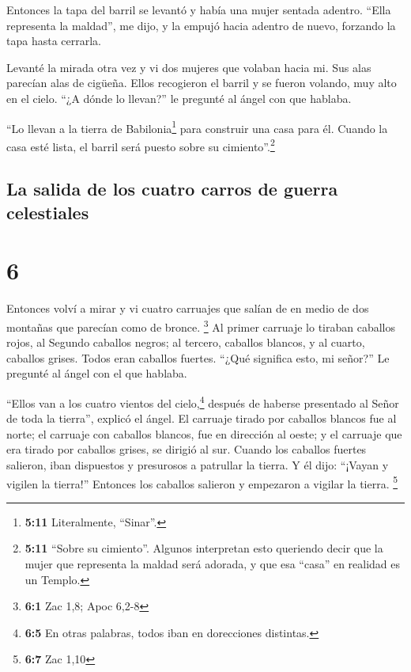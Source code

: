  Entonces la tapa del barril se levantó y había una mujer
sentada adentro.  ``Ella representa la maldad'', me dijo,
y la empujó hacia adentro de nuevo, forzando la tapa hasta cerrarla.

 Levanté la mirada otra vez y vi dos mujeres que volaban
hacia mi. Sus alas parecían alas de cigüeña. Ellos recogieron el barril
y se fueron volando, muy alto en el cielo.  ``¿A dónde lo
llevan?'' le pregunté al ángel con que hablaba.

 ``Lo llevan a la tierra de Babilonia\footnote{\textbf{5:11}
  Literalmente, ``Sinar''.} para construir una casa para él. Cuando la
casa esté lista, el barril será puesto sobre su cimiento''.\footnote{\textbf{5:11}
  ``Sobre su cimiento''. Algunos interpretan esto queriendo decir que la
  mujer que representa la maldad será adorada, y que esa ``casa'' en
  realidad es un Templo.}

\hypertarget{la-salida-de-los-cuatro-carros-de-guerra-celestiales}{%
\subsection{La salida de los cuatro carros de guerra
celestiales}\label{la-salida-de-los-cuatro-carros-de-guerra-celestiales}}

\hypertarget{section-5}{%
\section{6}\label{section-5}}

 Entonces volví a mirar y vi cuatro carruajes que salían
de en medio de dos montañas que parecían como de bronce. \footnote{\textbf{6:1}
  Zac 1,8; Apoc 6,2-8}  Al primer carruaje lo tiraban
caballos rojos, al Segundo caballos negros;  al tercero,
caballos blancos, y al cuarto, caballos grises. Todos eran caballos
fuertes.  ``¿Qué significa esto, mi señor?'' Le pregunté
al ángel con el que hablaba.

 ``Ellos van a los cuatro vientos del cielo,\footnote{\textbf{6:5}
  En otras palabras, todos iban en dorecciones distintas.} después de
haberse presentado al Señor de toda la tierra'', explicó el ángel.
 El carruaje tirado por caballos blancos fue al norte; el
carruaje con caballos blancos, fue en dirección al oeste; y el carruaje
que era tirado por caballos grises, se dirigió al sur. 
Cuando los caballos fuertes salieron, iban dispuestos y presurosos a
patrullar la tierra. Y él dijo: ``¡Vayan y vigilen la tierra!'' Entonces
los caballos salieron y empezaron a vigilar la tierra. \footnote{\textbf{6:7}
  Zac 1,10}

